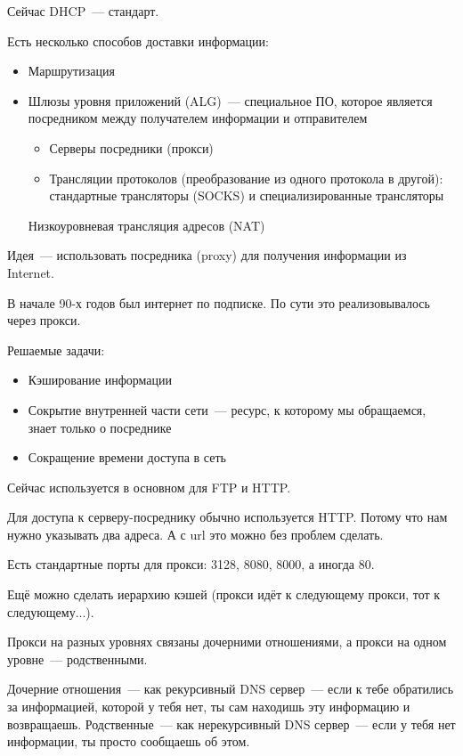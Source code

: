 Сейчас DHCP~--- стандарт.


Есть несколько способов доставки информации:
\begin{itemize}
    \item Маршрутизация
    \item Шлюзы уровня приложений (ALG)~--- специальное ПО, которое является посредником между получателем информации и отправителем
    \begin{itemize}
        \item Серверы посредники (прокси)
        \item Трансляции протоколов (преобразование из одного протокола в другой): стандартные трансляторы (SOCKS) и специализированные трансляторы
    \end{itemize}
    \item [Низкоуровневая] трансляция адресов (NAT)
\end{itemize} 


Идея~--- использовать посредника (proxy) для получения информации из Internet.

В начале 90-х годов был интернет по подписке. По сути это реализовывалось через прокси.

Решаемые задачи:
\begin{itemize}
    \item Кэширование информации
    \item Сокрытие внутренней части сети~--- ресурс, к которому мы обращаемся, знает только о посреднике
    \item Сокращение времени доступа в сеть
\end{itemize}

Сейчас используется в основном для FTP и HTTP.

Для доступа к серверу-посреднику обычно используется HTTP. Потому что нам нужно указывать два адреса. А с url это можно без проблем сделать.

Есть стандартные порты для прокси: 3128, 8080, 8000, а иногда 80.

Ещё можно сделать иерархию кэшей (прокси идёт к следующему прокси, тот к следующему...).

Прокси на разных уровнях связаны дочерними отношениями, а прокси на одном уровне~--- родственными.

Дочерние отношения~--- как рекурсивный DNS сервер~--- если к тебе обратились за информацией, которой у тебя нет, ты сам находишь эту информацию и возвращаешь. Родственные~--- как нерекурсивный DNS сервер~--- если у тебя нет информации, ты просто сообщаешь об этом.

